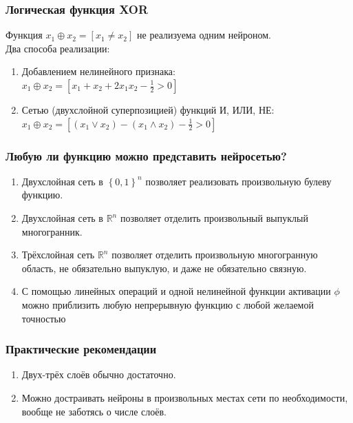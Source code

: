 \documentclass[12pt]{beamer}
\begin{document}
\begin{frame}\frametitle{Логическая функция XOR}
Функция $x_1 \oplus x_2 = [x_1 \neq x_2]$ не реализуема одним нейроном.\\
Два способа реализации:\\
\begin{enumerate}[--]
\item Добавлением нелинейного признака:\\
$x_1 \oplus x_2 = [x_1 + x_2 + 2x_1x_2 - \frac{1}{2} > 0]$
\item Сетью (двухслойной суперпозицией) функций И, ИЛИ, НЕ:\\
$x_1 \oplus x_2 = [(x_1 \vee x_2) - (x_1 \wedge x_2) - \frac{1}{2} > 0]$
\end{enumerate}
\end{frame}

\begin{frame}\frametitle{Любую ли функцию можно представить нейросетью?}
\begin{enumerate}[--]
\item Двухслойная сеть в $\left\{0, 1 \right\}^n$ позволяет реализовать произвольную булеву функцию.
\item Двухслойная сеть в $\mathbb{R}^n$ позволяет отделить произвольный выпуклый многогранник.
\item Трёхслойная сеть $\mathbb{R}^n$ позволяет отделить произвольную многогранную область, не обязательно выпуклую, и даже не обязательно связную.
\item С помощью линейных операций и одной нелинейной функции активации $\phi$ можно приблизить любую непрерывную функцию с любой желаемой точностью
\end{enumerate}
\end{frame}

\begin{frame}\frametitle{Практические рекомендации}
\begin{enumerate}[--]
\item Двух-трёх слоёв обычно достаточно.
\item Можно достраивать нейроны в произвольных местах сети по необходимости, вообще не заботясь о числе слоёв.
\end{enumerate}
\end{frame}
\end{document}
